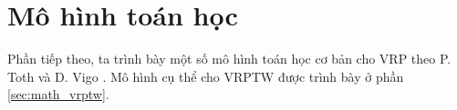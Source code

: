 \section{Mô hình toán học}
\label{sec:math}

Phần tiếp theo, ta trình bày một số mô hình toán học cơ bản cho VRP theo P. Toth và D. Vigo \cite{toth2002vehicle}. Mô hình cụ thể cho VRPTW được trình bày ở phần \ref{sec:math_vrptw}. 


